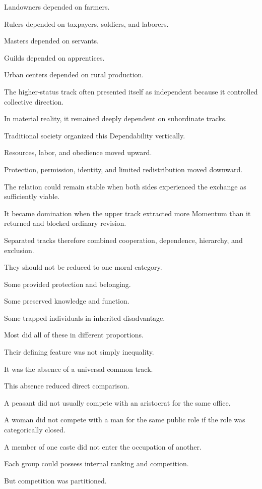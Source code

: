 Landowners depended on farmers.

Rulers depended on taxpayers, soldiers, and laborers.

Masters depended on servants.

Guilds depended on apprentices.

Urban centers depended on rural production.

The higher-status track often presented itself as independent because it controlled collective direction.

In material reality, it remained deeply dependent on subordinate tracks.

Traditional society organized this Dependability vertically.

Resources, labor, and obedience moved upward.

Protection, permission, identity, and limited redistribution moved downward.

The relation could remain stable when both sides experienced the exchange as sufficiently viable.

It became domination when the upper track extracted more Momentum than it returned and blocked ordinary revision.

Separated tracks therefore combined cooperation, dependence, hierarchy, and exclusion.

They should not be reduced to one moral category.

Some provided protection and belonging.

Some preserved knowledge and function.

Some trapped individuals in inherited disadvantage.

Most did all of these in different proportions.

Their defining feature was not simply inequality.

It was the absence of a universal common track.

This absence reduced direct comparison.

A peasant did not usually compete with an aristocrat for the same office.

A woman did not compete with a man for the same public role if the role was categorically closed.

A member of one caste did not enter the occupation of another.

Each group could possess internal ranking and competition.

But competition was partitioned.

